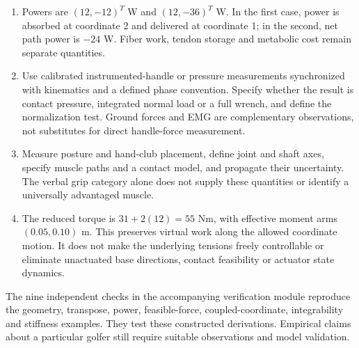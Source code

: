 \begin{enumerate}
\item Powers are $(12,-12)^T$ W and $(12,-36)^T$ W. In the first case, power is absorbed at coordinate 2 and delivered at coordinate 1; in the second, net path power is $-24$ W. Fiber work, tendon storage and metabolic cost remain separate quantities.

\item Use calibrated instrumented-handle or pressure measurements synchronized with kinematics and a defined phase convention. Specify whether the result is contact pressure, integrated normal load or a full wrench, and define the normalization test. Ground forces and EMG are complementary observations, not substitutes for direct handle-force measurement.

\item Measure posture and hand-club placement, define joint and shaft axes, specify muscle paths and a contact model, and propagate their uncertainty. The verbal grip category alone does not supply these quantities or identify a universally advantaged muscle.

\item The reduced torque is $31+2(12)=55$ Nm, with effective moment arms $(0.05,0.10)$ m. This preserves virtual work along the allowed coordinate motion. It does not make the underlying tensions freely controllable or eliminate unactuated base directions, contact feasibility or actuator state dynamics.
\end{enumerate}

The nine independent checks in the accompanying verification module reproduce the geometry, transpose, power, feasible-force, coupled-coordinate, integrability and stiffness examples. They test these constructed derivations. Empirical claims about a particular golfer still require suitable observations and model validation.
\clearpage
\flushbottom{}
